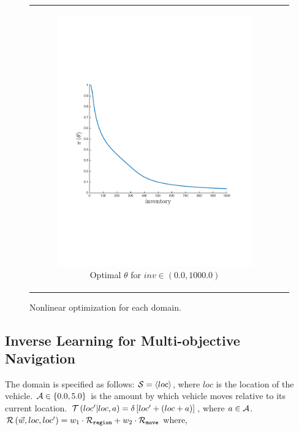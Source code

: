 {\begin{figure}[ht]
\begin{tabular}{cc}
            \begin{subfigure}{0.2\textwidth}\centering\includegraphics[width=\textwidth]{images/oe_opt_new}\caption{Optimal {\footnotesize $ \theta $} for {\footnotesize $ inv \in \left(0.0, 1000.0 \right) $}}\label{fig:oe_opt}\end{subfigure}&
            \\
        \end{tabular}
        \caption{Nonlinear optimization for each domain.}        
        \label{tab:opt_results}
        \vspace{-3mm}
    \end{figure}
}

\subsection{Inverse Learning for Multi-objective Navigation}
\label{sec:results_navigation}

The domain is specified as follows: {\footnotesize $ \mathcal{S} = \left\langle loc \right\rangle$}, where $ loc $ is the location of the vehicle. {\footnotesize $ \mathcal{A} \in \left\lbrace 0.0, 5.0 \right\rbrace $} is the amount by which vehicle moves relative to its current location. {\footnotesize $ \mathcal{T}\left( loc' | loc, a \right) = \delta \left[ loc' + (loc + a) \right] $}, where {\footnotesize $ a \in \mathcal{A} $}. {\footnotesize $ \mathcal{R}\left(\vec{w}, loc, loc'\right) = w_1 \cdot \mathcal{R}_{\mathtt{region}} + w_2 \cdot \mathcal{R}_{\mathtt{move}} $} where,

